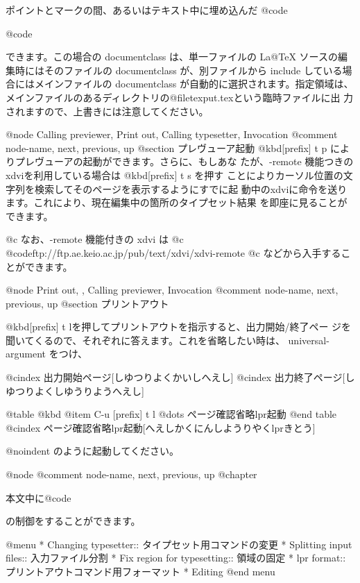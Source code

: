   ポイントとマークの間、あるいはテキスト中に埋め込んだ @code{%
@code{%
できます。この場合の documentclass は、単一ファイルの La@TeX{} ソースの編
集時にはそのファイルの documentclass が、別ファイルから include している場
合にはメインファイルの documentclass が自動的に選択されます。指定領域は、
メインファイルのあるディレクトリの@file{texput.tex}という臨時ファイルに出
力されますので、上書きには注意してください。

@node Calling previewer, Print out, Calling typesetter, Invocation
@comment  node-name,  next,  previous,  up
@section プレヴューア起動
  @kbd{[prefix] t p} によりプレヴューアの起動ができます。さらに、もしあな
たが、-remote 機能つきのxdviを利用している場合は @kbd{[prefix] t s} を押す
ことによりカーソル位置の文字列を検索してそのページを表示するようにすでに起
動中のxdviに命令を送ります。これにより、現在編集中の箇所のタイプセット結果
を即座に見ることができます。

@c なお、-remote 機能付きの xdvi は
@c @code{ftp://ftp.ae.keio.ac.jp/pub/text/xdvi/xdvi-remote}
@c などから入手することができます。

@node Print out,  , Calling previewer, Invocation
@comment  node-name,  next,  previous,  up
@section プリントアウト

  @kbd{[prefix] t l}を押してプリントアウトを指示すると、出力開始/終了ペー
ジを聞いてくるので、それぞれに答えます。これを省略したい時は、
universal-argument をつけ、

@cindex 出力開始ページ[しゆつりよくかいしへえし]
@cindex 出力終了ページ[しゆつりよくしゆうりようへえし]

@table @kbd
@item C-u [prefix] t l
        @dots{} ページ確認省略lpr起動
@end table
@cindex ページ確認省略lpr起動[へえしかくにんしようりやくlprきとう]

@noindent
のように起動してください。

@node %
@comment  node-name,  next,  previous,  up
@chapter %

  本文中に@code{%
の制御をすることができます。

@menu
* Changing typesetter::         タイプセット用コマンドの変更
* Splitting input files::       入力ファイル分割
* Fix region for typesetting::  領域の固定
* lpr format::                  プリントアウトコマンド用フォーマット
* Editing %
@end menu

}}}
